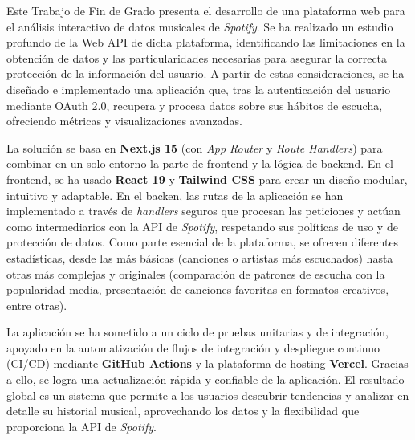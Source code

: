 Este Trabajo de Fin de Grado presenta el desarrollo de una plataforma web para el análisis interactivo de datos musicales de \textit{Spotify}. Se ha realizado un estudio profundo de la Web API de dicha plataforma, identificando las limitaciones en la obtención de datos y las particularidades necesarias para asegurar la correcta protección de la información del usuario. A partir de estas consideraciones, se ha diseñado e implementado una aplicación que, tras la autenticación del usuario mediante OAuth 2.0, recupera y procesa datos sobre sus hábitos de escucha, ofreciendo métricas y visualizaciones avanzadas.

La solución se basa en \textbf{Next.js 15} (con \textit{App Router} y \textit{Route Handlers}) para combinar en un solo entorno la parte de frontend y la lógica de backend. En el frontend, se ha usado \textbf{React 19} y \textbf{Tailwind CSS} para crear un diseño modular, intuitivo y adaptable. En el backen, las rutas de la aplicación se han implementado a través de \textit{handlers} seguros que procesan las peticiones y actúan como intermediarios con la API de \textit{Spotify}, respetando sus políticas de uso y de protección de datos. Como parte esencial de la plataforma, se ofrecen diferentes estadísticas, desde las más básicas (canciones o artistas más escuchados) hasta otras más complejas y originales (comparación de patrones de escucha con la popularidad media, presentación de canciones favoritas en formatos creativos, entre otras).

La aplicación se ha sometido a un ciclo de pruebas unitarias y de integración, apoyado en la automatización de flujos de integración y despliegue continuo (CI/CD) mediante \textbf{GitHub Actions} y la plataforma de hosting \textbf{Vercel}. Gracias a ello, se logra una actualización rápida y confiable de la aplicación. El resultado global es un sistema que permite a los usuarios descubrir tendencias y analizar en detalle su historial musical, aprovechando los datos y la flexibilidad que proporciona la API de \textit{Spotify}.